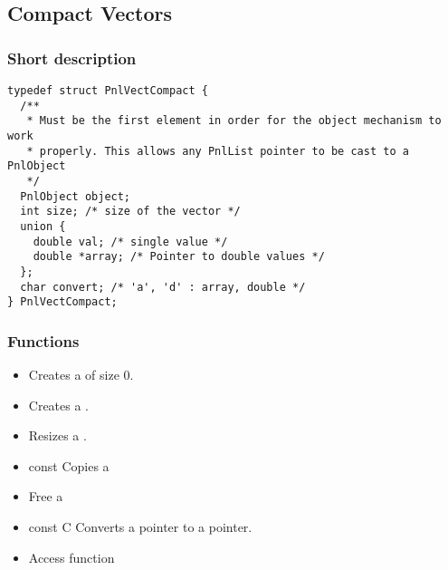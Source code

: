 \subsection{Compact Vectors}
\subsubsection{Short description}

\begin{verbatim}
typedef struct PnlVectCompact {
  /**
   * Must be the first element in order for the object mechanism to work
   * properly. This allows any PnlList pointer to be cast to a PnlObject
   */
  PnlObject object; 
  int size; /* size of the vector */
  union {
    double val; /* single value */
    double *array; /* Pointer to double values */
  };
  char convert; /* 'a', 'd' : array, double */
} PnlVectCompact;
\end{verbatim}

\subsubsection{Functions}

\begin{itemize}
  \item {}
  \sshortdescribe Creates a  of size 0.  

\item {}
  \sshortdescribe Creates a .  

\item {} 
  \sshortdescribe Resizes a .  

\item {} {const \ptr {}}
  \sshortdescribe Copies a   

\item {}
  \sshortdescribe Free a   

\item {}
  {const  \ptr C} 
  \sshortdescribe Converts a  pointer to a  pointer.  

\item {}
  \sshortdescribe Access function  
\end{itemize}

